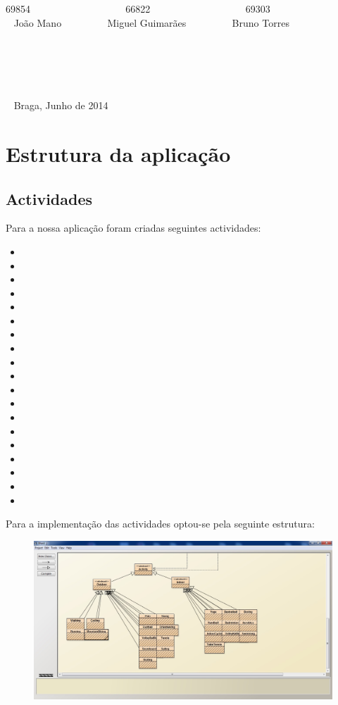 \documentclass[10pt,notitlepage]{article}
\begin{document}
\begin{titlepage}
\begin{center}
69854 ~~~~~~~~~~~~~~~~~~ 66822 ~~~~~~~~~~~~~~~~~~ 69303   \\~  João Mano ~~~~~~~~ Miguel Guimarães ~~~~~~~~ Bruno Torres  \\~ \\~ \\~ \\~ \\~ \\~ Braga, Junho de 2014
\end{center}
\end{titlepage}




\tableofcontents

\newpage


\section{Estrutura da aplicação}

\subsection{Actividades}
Para a nossa aplicação foram criadas seguintes actividades:
\begin{itemize}
\item 
\item
\item
\item
\item
\item
\item
\item
\item
\item
\item 
\item
\item
\item
\item
\item
\item
\item
\item

\end{itemize}
Para a implementação das actividades optou-se pela seguinte estrutura:
\begin{figure}[h]
\centering
\includegraphics[scale=0.5]{Activity.jpg}
\end{figure}
\end{document}
